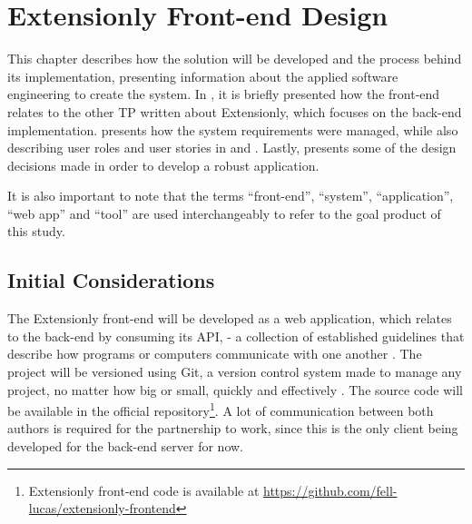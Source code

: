 \chapter{Extensionly Front-end Design}\label{extensionly}

This chapter describes how the solution will be developed and the process behind its implementation, presenting information about the applied software engineering to create the system. In , it is briefly presented how the front-end relates to the other \ac{TP} written about Extensionly, which focuses on the back-end implementation.  presents how the system requirements were managed, while also describing user roles and user stories in  and . Lastly,  presents some of the design decisions made in order to develop a robust application.

It is also important to note that the terms ``front-end'', ``system'', ``application'', ``web app'' and ``tool'' are used interchangeably to refer to the goal product of this study.

\section{Initial Considerations}\label{ext:initial-considerations}

The Extensionly front-end will be developed as a web application, which relates to the back-end by consuming its \ac{API}, - a collection of established guidelines that describe how programs or computers communicate with one another \cite{ibmapi}. The project will be versioned using Git, a version control system made to manage any project, no matter how big or small, quickly and effectively \cite{chacon2014pro}. The source code will be available in the official repository\footnote{Extensionly front-end code is available at \url{https://github.com/fell-lucas/extensionly-frontend}}. A lot of communication between both authors is required for the partnership to work, since this is the only client being developed for the back-end server for now.

